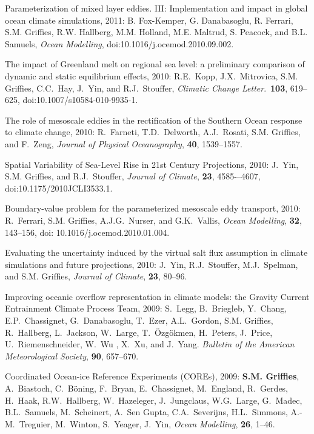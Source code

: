 \begin{etaremune}
\item Parameterization of mixed layer eddies. III: Implementation and impact in global ocean climate simulations, 2011: B. Fox-Kemper,
  G. Danabasoglu, R. Ferrari, S.M. Grif\/f\/ies, R.W. Hallberg, M.M. Holland, M.E. Maltrud, S. Peacock, and B.L. Samuels, {\it Ocean Modelling}, doi:10.1016/j.ocemod.2010.09.002.

\item The impact of Greenland melt on regional sea level: a preliminary comparison of dynamic and static equilibrium effects, 2010: R.E.\ Kopp, J.X.\ Mitrovica, S.M. Grif\/f\/ies, C.C.\  Hay, J.\ Yin, and R.J.\ Stouffer, {\it Climatic Change Letter}.\,
  {\bf 103}, 619--625, doi:10.1007/s10584-010-9935-1.

\item The role of mesoscale eddies in the rectification of the Southern Ocean response to climate change, 2010: R.\ Farneti, T.D.\
  Delworth, A.J.\ Rosati, S.M. Grif\/f\/ies, and F.\ Zeng, {\it Journal of Physical Oceanography}, {\bf 40}, 1539--1557.

\item Spatial Variability of Sea-Level Rise in 21st Century Projections, 2010: J.\ Yin, S.M. Grif\/f\/ies, and R.J.\ Stouffer, {\it Journal of Climate}, {\bf 23}, 4585-–4607,
doi:10.1175/2010JCLI3533.1.

\item Boundary-value problem for the parameterized mesoscale eddy transport, 2010: R.\ Ferrari, S.M. Grif\/f\/ies, A.J.G.\
  Nurser, and G.K.\ Vallis, {\em Ocean Modelling}, {\bf 32}, 143--156, doi: 10.1016/j.ocemod.2010.01.004.

\item Evaluating the uncertainty induced by the virtual salt flux assumption in climate simulations and future projections, 2010: J.\
  Yin, R.J.\ Stouffer, M.J.\ Spelman, and S.M. Grif\/f\/ies, {\em Journal of Climate}, {\bf 23}, 80--96.

\item Improving oceanic overflow representation in climate models: the   Gravity Current Entrainment Climate Process Team, 2009: S.\ Legg, B.\ Briegleb, Y.\ Chang, E.P.\ Chassignet, G.\ Danabasoglu, T.\
  Ezer, A.L.\ Gordon, S.M. Grif\/f\/ies, R.\ Hallberg, L.\ Jackson, W.\ Large, T.\ \"Ozg\"okmen, H.\ Peters, J.\ Price, U.\
  Riemenschneider, W.\ Wu , X.\ Xu, and J.\ Yang.  {\em Bulletin of the American Meteorological Society}, {\bf 90}, 657--670.

\item Coordinated Ocean-ice Reference Experiments (COREs), 2009: {\bf
    S.M. Grif\/f\/ies}, A.\ Biastoch, C.\ B\"{o}ning, F.\ Bryan, E.\
  Chassignet, M.\ England, R.\ Gerdes, H.\ Haak, R.W.\ Hallberg, W.\
  Hazeleger, J.\ Jungclaus, W.G.\ Large, G.\ Madec, B.L.\ Samuels, M.\
  Scheinert, A.\ Sen Gupta, C.A.\ Severijns, H.L.\ Simmons, A.-M.\
  Treguier, M.\ Winton, S.\ Yeager, J.\ Yin,  {\em Ocean Modelling},
  {\bf 26}, 1--46.  


\end{etaremune}
